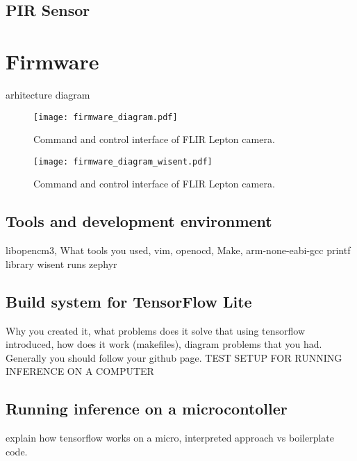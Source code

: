 

\subsection{ PIR Sensor}

\section{ Firmware}
    arhitecture diagram 

\begin{figure}[ht]
        \centering
        \texttt{[image: firmware\_diagram.pdf]} 
        \caption{ Command and control interface of FLIR Lepton camera.} 
        \label{firmware_diagram}
\end{figure}

\begin{figure}[ht]
        \centering
        \texttt{[image: firmware\_diagram\_wisent.pdf]} 
        \caption{ Command and control interface of FLIR Lepton camera.} 
        \label{firmware_diagram_wisent}
\end{figure}

\subsection{ Tools and development environment}
    libopencm3, 
    What tools you used, vim, openocd, Make, arm-none-eabi-gcc
    printf library
    wisent runs zephyr

\subsection{ Build system for TensorFlow Lite}
    Why you created it, 
    what problems does it solve that using tensorflow introduced, 
    how does it work (makefiles), diagram
    problems that you had. 
    Generally you should follow your github page. 
    TEST SETUP FOR RUNNING INFERENCE ON A COMPUTER

\subsection{ Running inference on a microcontoller}
    explain how tensorflow works on a micro, interpreted approach vs boilerplate code. 

